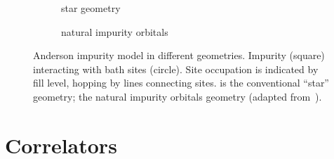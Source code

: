 \begin{figure}[ht]
    \centering
    \savebox{\imagebox}{} %
    \begin{subfigure}{0.45\textwidth}
        \centering
        \usebox{\imagebox}
        \caption{star geometry}
        \label{subfig:geometry-star}
    \end{subfigure}
    \begin{subfigure}{0.45\textwidth}
        \centering
        \raisebox{\dimexpr0.5\ht\imagebox-0.5\height}
        {
            
        }
        \caption{natural impurity orbitals}
        \label{subfig:geometry-natural-impurity-orbitals}
    \end{subfigure}
    \caption{
        Anderson impurity model in different geometries.
        Impurity (square) interacting with bath sites (circle).
        Site occupation is indicated by fill level, hopping by lines connecting sites.
         is the conventional ``star'' geometry;
         the natural impurity orbitals geometry
        (adapted from~\cite{Lu2019}).
    }
\end{figure}

\section{Correlators}

